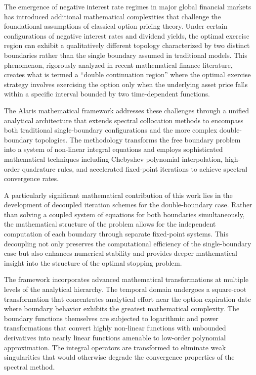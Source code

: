 \documentclass[
  11pt,
  11pt,
  letterpaper,
  onecolumn]{article}
\begin{document}
The emergence of negative interest rate regimes in major global
financial markets has introduced additional mathematical complexities
that challenge the foundational assumptions of classical option pricing
theory. Under certain configurations of negative interest rates and
dividend yields, the optimal exercise region can exhibit a qualitatively
different topology characterized by two distinct boundaries rather than
the single boundary assumed in traditional models. This phenomenon,
rigorously analyzed in recent mathematical finance literature, creates
what is termed a ``double continuation region'' where the optimal
exercise strategy involves exercising the option only when the
underlying asset price falls within a specific interval bounded by two
time-dependent functions.

The Alaris mathematical framework addresses these challenges through a
unified analytical architecture that extends spectral collocation
methods to encompass both traditional single-boundary configurations and
the more complex double-boundary topologies. The methodology transforms
the free boundary problem into a system of non-linear integral equations
and employs sophisticated mathematical techniques including Chebyshev
polynomial interpolation, high-order quadrature rules, and accelerated
fixed-point iterations to achieve spectral convergence rates.

A particularly significant mathematical contribution of this work lies
in the development of decoupled iteration schemes for the
double-boundary case. Rather than solving a coupled system of equations
for both boundaries simultaneously, the mathematical structure of the
problem allows for the independent computation of each boundary through
separate fixed-point systems. This decoupling not only preserves the
computational efficiency of the single-boundary case but also enhances
numerical stability and provides deeper mathematical insight into the
structure of the optimal stopping problem.

The framework incorporates advanced mathematical transformations at
multiple levels of the analytical hierarchy. The temporal domain
undergoes a square-root transformation that concentrates analytical
effort near the option expiration date where boundary behavior exhibits
the greatest mathematical complexity. The boundary functions themselves
are subjected to logarithmic and power transformations that convert
highly non-linear functions with unbounded derivatives into nearly
linear functions amenable to low-order polynomial approximation. The
integral operators are transformed to eliminate weak singularities that
would otherwise degrade the convergence properties of the spectral
method.
\end{document}
